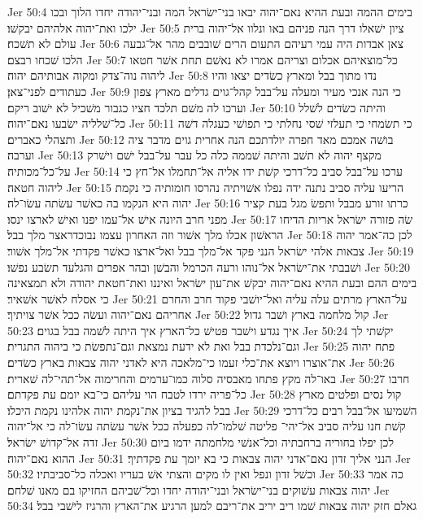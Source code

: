 Jer 50:4  בימים ההמה ובעת ההיא נאם־יהוה יבאו בני־ישׂראל המה ובני־יהודה יחדו הלוך ובכו ילכו ואת־יהוה אלהיהם יבקשׁו׃
Jer 50:5  ציון ישׁאלו דרך הנה פניהם באו ונלוו אל־יהוה ברית עולם לא תשׁכח׃
Jer 50:6  צאן אבדות היה עמי רעיהם התעום הרים שׁובבים מהר אל־גבעה הלכו שׁכחו רבצם׃
Jer 50:7  כל־מוצאיהם אכלום וצריהם אמרו לא נאשׁם תחת אשׁר חטאו ליהוה נוה־צדק ומקוה אבותיהם יהוה׃
Jer 50:8  נדו מתוך בבל ומארץ כשׂדים יצאו והיו כעתודים לפני־צאן׃
Jer 50:9  כי הנה אנכי מעיר ומעלה על־בבל קהל־גוים גדלים מארץ צפון וערכו לה משׁם תלכד חציו כגבור משׁכיל לא ישׁוב ריקם׃
Jer 50:10  והיתה כשׂדים לשׁלל כל־שׁלליה ישׂבעו נאם־יהוה׃
Jer 50:11  כי תשׂמחי כי תעלזי שׁסי נחלתי כי תפושׁי כעגלה דשׁה ותצהלי כאברים׃
Jer 50:12  בושׁה אמכם מאד חפרה יולדתכם הנה אחרית גוים מדבר ציה וערבה׃
Jer 50:13  מקצף יהוה לא תשׁב והיתה שׁממה כלה כל עבר על־בבל ישׁם וישׁרק על־כל־מכותיה׃
Jer 50:14  ערכו על־בבל סביב כל־דרכי קשׁת ידו אליה אל־תחמלו אל־חץ כי ליהוה חטאה׃
Jer 50:15  הריעו עליה סביב נתנה ידה נפלו אשׁויתיה נהרסו חומותיה כי נקמת יהוה היא הנקמו בה כאשׁר עשׂתה עשׂו־לה׃
Jer 50:16  כרתו זורע מבבל ותפשׂ מגל בעת קציר מפני חרב היונה אישׁ אל־עמו יפנו ואישׁ לארצו ינסו׃
Jer 50:17  שׂה פזורה ישׂראל אריות הדיחו הראשׁון אכלו מלך אשׁור וזה האחרון עצמו נבוכדראצר מלך בבל׃
Jer 50:18  לכן כה־אמר יהוה צבאות אלהי ישׂראל הנני פקד אל־מלך בבל ואל־ארצו כאשׁר פקדתי אל־מלך אשׁור׃
Jer 50:19  ושׁבבתי את־ישׂראל אל־נוהו ורעה הכרמל והבשׁן ובהר אפרים והגלעד תשׂבע נפשׁו׃
Jer 50:20  בימים ההם ובעת ההיא נאם־יהוה יבקשׁ את־עון ישׂראל ואיננו ואת־חטאת יהודה ולא תמצאינה כי אסלח לאשׁר אשׁאיר׃
Jer 50:21  על־הארץ מרתים עלה עליה ואל־יושׁבי פקוד חרב והחרם אחריהם נאם־יהוה ועשׂה ככל אשׁר צויתיך׃
Jer 50:22  קול מלחמה בארץ ושׁבר גדול׃
Jer 50:23  איך נגדע וישׁבר פטישׁ כל־הארץ איך היתה לשׁמה בבל בגוים׃
Jer 50:24  יקשׁתי לך וגם־נלכדת בבל ואת לא ידעת נמצאת וגם־נתפשׂת כי ביהוה התגרית׃
Jer 50:25  פתח יהוה את־אוצרו ויוצא את־כלי זעמו כי־מלאכה היא לאדני יהוה צבאות בארץ כשׂדים׃
Jer 50:26  באו־לה מקץ פתחו מאבסיה סלוה כמו־ערמים והחרימוה אל־תהי־לה שׁארית׃
Jer 50:27  חרבו כל־פריה ירדו לטבח הוי עליהם כי־בא יומם עת פקדתם׃
Jer 50:28  קול נסים ופלטים מארץ בבל להגיד בציון את־נקמת יהוה אלהינו נקמת היכלו׃
Jer 50:29  השׁמיעו אל־בבל רבים כל־דרכי קשׁת חנו עליה סביב אל־יהי־ פליטה שׁלמו־לה כפעלה ככל אשׁר עשׂתה עשׂו־לה כי אל־יהוה זדה אל־קדושׁ ישׂראל׃
Jer 50:30  לכן יפלו בחוריה ברחבתיה וכל־אנשׁי מלחמתה ידמו ביום ההוא נאם־יהוה׃
Jer 50:31  הנני אליך זדון נאם־אדני יהוה צבאות כי בא יומך עת פקדתיך׃
Jer 50:32  וכשׁל זדון ונפל ואין לו מקים והצתי אשׁ בעריו ואכלה כל־סביבתיו׃
Jer 50:33  כה אמר יהוה צבאות עשׁוקים בני־ישׂראל ובני־יהודה יחדו וכל־שׁביהם החזיקו בם מאנו שׁלחם׃
Jer 50:34  גאלם חזק יהוה צבאות שׁמו ריב יריב את־ריבם למען הרגיע את־הארץ והרגיז לישׁבי בבל׃
